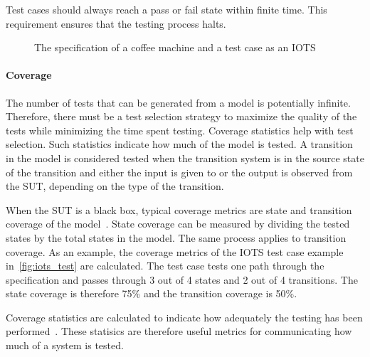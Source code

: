 Test cases should always reach a pass or fail state within finite time. This requirement ensures that the testing process halts.
\begin{figure}[ht]
  \begin{center}
    \subfloat[An IOTS]{\label{fig:iots_example}}
  \end{center}
  \caption{The specification of a coffee machine and a test case as an IOTS}
\end{figure}

\paragraph*{Coverage}\label{sec:coverage}
The number of tests that can be generated from a model is potentially infinite. Therefore, there must be a test selection strategy to maximize the quality of the tests while minimizing the time spent testing. Coverage statistics help with test selection. Such statistics indicate how much of the model is tested. A transition in the model is considered tested when the transition system is in the source state of the transition and either the input is given to or the output is observed from the SUT, depending on the type of the transition.

When the SUT is a black box, typical coverage metrics are state and transition coverage of the model~\cite{Lee:testing, Nachmanson:testing, Hasan:testing}. State coverage can be measured by dividing the tested states by the total states in the model. The same process applies to transition coverage. As an example, the coverage metrics of the IOTS test case example in~\ref{fig:iots_test} are calculated. The test case tests one path through the specification and passes through 3 out of 4 states and 2 out of 4 transitions. The state coverage is therefore 75\% and the transition coverage is 50\%.

Coverage statistics are calculated to indicate how adequately the testing has been performed~\cite{Zhu:coverage}. These statisics are therefore useful metrics for communicating how much of a system is tested.

